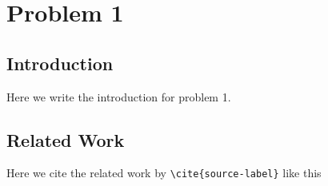 \chapter{Problem 1} \label{ch:problem1}


\section{Introduction} \label{sec:problem1-introduction}
Here we write the introduction for problem 1.


\section{Related Work} \label{sec:problem1-related-work}

Here we cite the related work by \texttt{\textbackslash cite\{source-label\}} like this \cite{recent-progress-in-technologies-for-tactile-sensors}